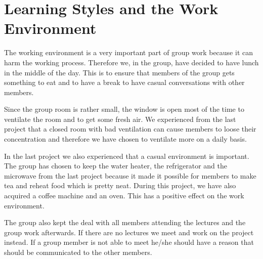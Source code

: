 \section{Learning Styles and the Work Environment}
The working environment is a very important part of group work because it can harm the working process. Therefore we, in the group, have decided to have lunch in the middle of the day. This is to ensure that members of the group gets something to eat and to have a break to have casual conversations with other members.

Since the group room is rather small, the window is open most of the time to ventilate the room and to get some fresh air. We experienced from the last project that a closed room with bad ventilation can cause members to loose their concentration and therefore we have chosen to ventilate more on a daily basis.

In the last project we also experienced that a casual environment is important. The group has chosen to keep the water heater, the refrigerator and the microwave from the last project because it made it possible for members to make tea and reheat food which is pretty neat. During this project, we have also acquired a coffee machine and an oven. This has a positive effect on the work environment.

The group also kept the deal with all members attending the lectures and the group work afterwards. If there are no lectures we meet and work on the project instead.
If a group member is not able to meet he/she should have a reason that should be communicated to the other members.